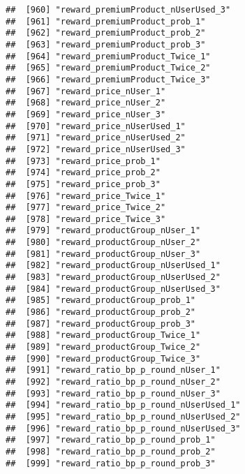 \documentclass[10pt]{report}
\begin{document}
\begin{verbatim}
##  [960] "reward_premiumProduct_nUserUsed_3"                    
##  [961] "reward_premiumProduct_prob_1"                         
##  [962] "reward_premiumProduct_prob_2"                         
##  [963] "reward_premiumProduct_prob_3"                         
##  [964] "reward_premiumProduct_Twice_1"                        
##  [965] "reward_premiumProduct_Twice_2"                        
##  [966] "reward_premiumProduct_Twice_3"                        
##  [967] "reward_price_nUser_1"                                 
##  [968] "reward_price_nUser_2"                                 
##  [969] "reward_price_nUser_3"                                 
##  [970] "reward_price_nUserUsed_1"                             
##  [971] "reward_price_nUserUsed_2"                             
##  [972] "reward_price_nUserUsed_3"                             
##  [973] "reward_price_prob_1"                                  
##  [974] "reward_price_prob_2"                                  
##  [975] "reward_price_prob_3"                                  
##  [976] "reward_price_Twice_1"                                 
##  [977] "reward_price_Twice_2"                                 
##  [978] "reward_price_Twice_3"                                 
##  [979] "reward_productGroup_nUser_1"                          
##  [980] "reward_productGroup_nUser_2"                          
##  [981] "reward_productGroup_nUser_3"                          
##  [982] "reward_productGroup_nUserUsed_1"                      
##  [983] "reward_productGroup_nUserUsed_2"                      
##  [984] "reward_productGroup_nUserUsed_3"                      
##  [985] "reward_productGroup_prob_1"                           
##  [986] "reward_productGroup_prob_2"                           
##  [987] "reward_productGroup_prob_3"                           
##  [988] "reward_productGroup_Twice_1"                          
##  [989] "reward_productGroup_Twice_2"                          
##  [990] "reward_productGroup_Twice_3"                          
##  [991] "reward_ratio_bp_p_round_nUser_1"                      
##  [992] "reward_ratio_bp_p_round_nUser_2"                      
##  [993] "reward_ratio_bp_p_round_nUser_3"                      
##  [994] "reward_ratio_bp_p_round_nUserUsed_1"                  
##  [995] "reward_ratio_bp_p_round_nUserUsed_2"                  
##  [996] "reward_ratio_bp_p_round_nUserUsed_3"                  
##  [997] "reward_ratio_bp_p_round_prob_1"                       
##  [998] "reward_ratio_bp_p_round_prob_2"                       
##  [999] "reward_ratio_bp_p_round_prob_3"                       

\end{verbatim}
\end{document}
